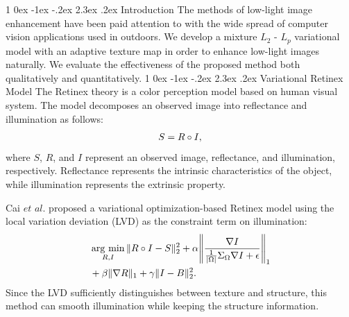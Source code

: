 \documentclass[a4paper,twocolumn,10pt]{article}
\makeatletter
\newcommand{\argmin}{\mathop{\rm arg~min}\limits}
\renewcommand{\section}{%
  \@startsection{section}%
   {1}%
   {\z@}%
   {0ex \@plus -1ex \@minus -.2ex}%
   {2.3ex \@plus.2ex}%
   {\normalfont\large\bfseries}%
}%
\makeatother
\begin{document}
\thispagestyle{empty}
%
\setlength{\baselineskip}{3mm}
%
\section{Introduction}
\thispagestyle{empty}
\vspace{-0.3cm}
The methods of low-light image enhancement have been paid attention to with the wide spread of computer vision applications used in outdoors. We develop a mixture $L_{2}$ - $L_{p}$ variational model with an adaptive texture map in order to enhance low-light images naturally. We evaluate the effectiveness of the proposed method both qualitatively and quantitatively.
\vspace{0.1cm}
\section{Variational Retinex Model}
\vspace{-0.3cm}
The Retinex theory \cite{retinex} is a color perception model based on human visual system. 
The model decomposes an observed image into reflectance and illumination as follows:
\vspace{-0.3cm}
\begin{eqnarray}
S = R \circ I, \label{eq:retinex}
\vspace{-0.3cm}
\end{eqnarray}
where $S$, $R$, and $I$ represent an observed image, reflectance, and illumination, respectively. Reflectance represents the intrinsic characteristics of the object, while illumination represents the extrinsic property.\par 
Cai $et$ $al.$ \cite{jiep} proposed a variational optimization-based Retinex model using the local variation deviation (LVD) as the constraint term on illumination:
\vspace{-0.25cm}
\begin{eqnarray}
	\begin{split}
		&\argmin_{R, I} \|R \circ I - S\|_{2}^{2} + \alpha{\left \|\frac{\nabla{I}}{\frac{1}{|\Omega|}\Sigma_{\Omega}\nabla{I} + \epsilon} \right\|_{1}}\\
		&+ \beta{\|\nabla{R}\|_{1}} + \gamma{\|I - B\|_{2}^{2}}.
	\end{split}
\end{eqnarray}
Since the LVD sufficiently distinguishes between texture and structure, this method can smooth illumination while keeping the structure information.
\vspace{0.1cm}
\end{document}
